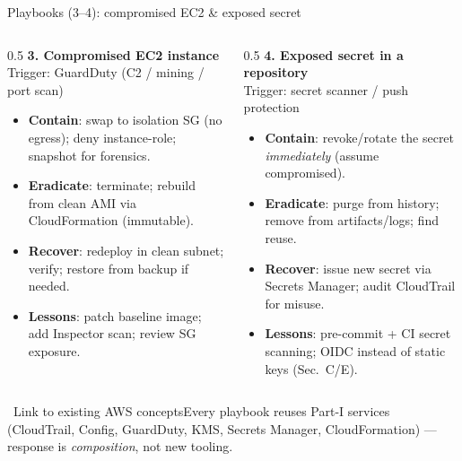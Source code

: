 \documentclass[aspectratio=169,10pt]{beamer}
\newcommand{\term}[1]{{\color{awsink}\textbf{#1}}}
\newcommand{\bridge}[1]{%
  \begin{block}{\small\ding{43}\ Link to existing AWS concepts}\small #1\end{block}}
\begin{document}
\begin{frame}{Playbooks (3--4): compromised EC2 \& exposed secret}
  \footnotesize
  \begin{columns}[T]
    \begin{column}{0.5\textwidth}
      \textbf{\color{accent}3. Compromised EC2 instance}\\
      {\tiny Trigger: GuardDuty (C2 / mining / port scan)}
      \begin{itemize}\setlength\itemsep{0pt}
        \item \term{Contain}: swap to isolation SG (no egress); deny instance-role; snapshot for forensics.
        \item \term{Eradicate}: terminate; rebuild from clean AMI via CloudFormation (immutable).
        \item \term{Recover}: redeploy in clean subnet; verify; restore from backup if needed.
        \item \term{Lessons}: patch baseline image; add Inspector scan; review SG exposure.
      \end{itemize}
    \end{column}
    \begin{column}{0.5\textwidth}
      \textbf{\color{accent}4. Exposed secret in a repository}\\
      {\tiny Trigger: secret scanner / push protection}
      \begin{itemize}\setlength\itemsep{0pt}
        \item \term{Contain}: revoke/rotate the secret \emph{immediately} (assume compromised).
        \item \term{Eradicate}: purge from history; remove from artifacts/logs; find reuse.
        \item \term{Recover}: issue new secret via Secrets Manager; audit CloudTrail for misuse.
        \item \term{Lessons}: pre-commit + CI secret scanning; OIDC instead of static keys (Sec.~C/E).
      \end{itemize}
    \end{column}
  \end{columns}
  \vfill
  \bridge{Every playbook reuses Part-I services (CloudTrail, Config, GuardDuty, KMS, Secrets Manager,
  CloudFormation) --- response is \emph{composition}, not new tooling.}
\end{frame}

\end{document}
